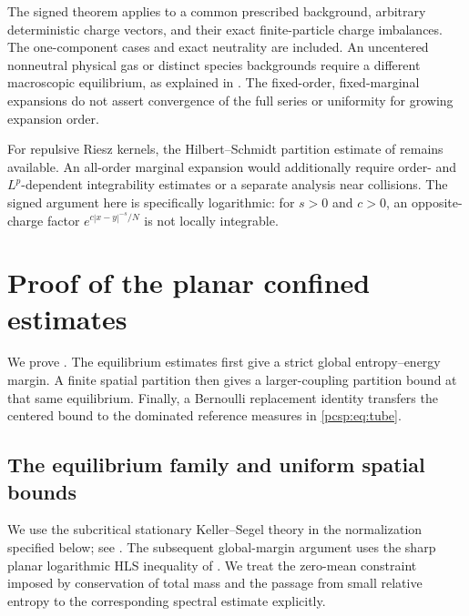 \documentclass[11pt,reqno]{amsart}
\numberwithin{equation}{section}
\theoremstyle{plain}
\theoremstyle{definition}
\begin{document}
The signed theorem applies to a common prescribed background, arbitrary deterministic charge vectors, and their exact finite-particle charge imbalances. The one-component cases and exact neutrality are included. An uncentered nonneutral physical gas or distinct species backgrounds require a different macroscopic equilibrium, as explained in . The fixed-order, fixed-marginal expansions do not assert convergence of the full series or uniformity for growing expansion order.

For repulsive Riesz kernels, the Hilbert--Schmidt partition estimate of \cite{DelgadinoGvalaniRosenzweig2026} remains available. An all-order marginal expansion would additionally require order- and $L^p$-dependent integrability estimates or a separate analysis near collisions. The signed argument here is specifically logarithmic: for $s>0$ and $c>0$, an opposite-charge factor $e^{c|x-y|^{-s}/N}$ is not locally integrable.

\section{Proof of the planar confined estimates}
\label{app:planar-confined-static-package}

We prove . The equilibrium estimates first give a strict global entropy--energy margin. A finite spatial partition then gives a larger-coupling partition bound at that same equilibrium. Finally, a Bernoulli replacement identity transfers the centered bound to the dominated reference measures in \eqref{pcsp:eq:tube}.

\subsection{The equilibrium family and uniform spatial bounds}

We use the subcritical stationary Keller--Segel theory in the normalization specified below; see \cite[Section~1, equation~(1.10)]{CamposDolbeault2014}. The subsequent global-margin argument uses the sharp planar logarithmic HLS inequality of \cite{CarlenLoss1992}. We treat the zero-mean constraint imposed by conservation of total mass and the passage from small relative entropy to the corresponding spectral estimate explicitly.
\end{document}
